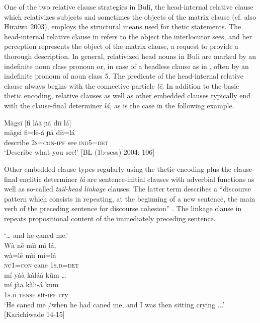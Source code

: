 \documentclass[output=paper]{langsci/langscibook}
\begin{document}
One of the two relative clause strategies in Buli, the head-internal relative clause which relativizes subjects and sometimes the objects of the matrix clause (cf. also Hiraiwa 2003), employs the structural means used for thetic statements. The head-internal relative clause in  refers to the object the interlocutor sees, and her perception represents the object of the matrix clause, a request to provide a thorough description. In general, relativized head nouns in Buli are marked by an indefinite noun class pronoun or, in case of a headless clause as in , often by an indefinite pronoun of noun class 5. The predicate of the head-internal relative clause always begins with the connective particle \textit{l\={e}}. In addition to the basic thetic encoding, relative clauses as well as other embedded clauses typically end with the clause-final determiner \textit{lá, }as is the case in the following example.

\ea
\glll \textup{}  M\={a}gs\={i}    \textup{[}fi là\={a}     ɲ\={a}  d\={i}\={i}   lá\textup{]}\\
  \textup{  m\={a}gsi    fi=l\={e}-á     ɲ\={a}  d\={i}i=lá}\\
       describe    2\textsc{s}=\textsc{con}{}-\textsc{ipf}   see     \textsc{ind}5=\textsc{det}\\
\glt ‘Describe what you see!’ [BL (1b-sess) 2004: 106]
\z

Other embedded clause types regularly using the thetic encoding plus the clause-final enclitic determiner \textit{lá} are sentence-initial clauses with adverbial functions as well as so-called \textit{tail-head linkage} clauses. The latter term describes a “discourse pattern which consists in repeating, at the beginning of a new sentence, the main verb of the preceding sentence for discourse cohesion” \citep[109]{Guillaume2011}. The linkage clause in  repeats propositional content of the immediately preceding sentence. 

\ea
‘… and he caned me.’\\
\glll   Wà  n\={e}  mìì  mì   lá,\\
  \textup{  wà=l\={e}  mìi  mí=lá}\\
     \textsc{  nc}1=\textsc{con}\textsubscript{  }cane  1\textsc{s}.\textsc{d}=\textsc{det}\\
\glll   mí    yàà  kàláá    k\={u}m …\\
  \textup{  mí    jàa  kàli-á    k\={u}m}\\
       1\textsc{s}.\textsc{d}  \textsc{tense}  sit-\textsc{ipf}    cry\\
\glt ‘He caned me /when he had caned me, and I was then sitting crying ...’ [Karichiwade 14-15]
\z
\end{document}
